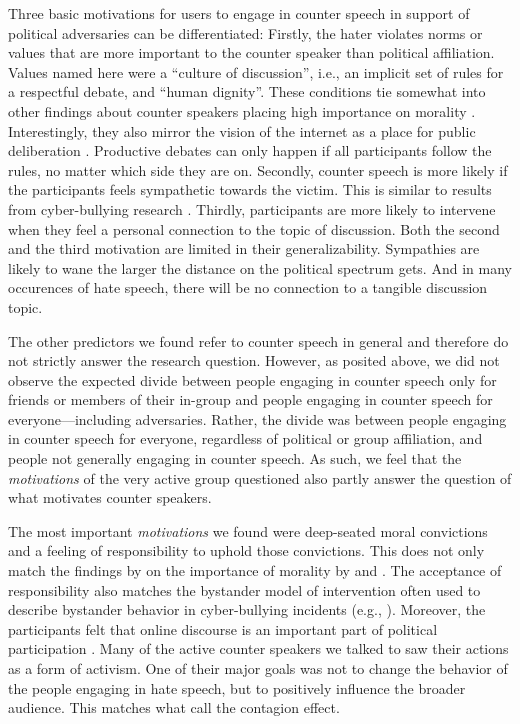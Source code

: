 \documentclass[runningheads]{llncs}
\begin{document}
Three basic motivations for users to engage in counter speech in support of political adversaries can be differentiated:
Firstly, the hater violates norms or values that are more important to the counter speaker than political affiliation.
Values named here were a \enquote{culture of discussion}, i.e., an implicit set of rules for a respectful debate, and \enquote{human dignity}.
These conditions tie somewhat into other findings about counter speakers placing high importance on morality \autocite{lambeStandingBullyingSocial2019,wilhelmGenderedMoralityBacklash2019}.
Interestingly, they also mirror the vision of the internet as a place for public deliberation \autocite{chenOnlineIncivilityPublic2017}.
Productive debates can only happen if all participants follow the rules, no matter which side they are on.
Secondly, counter speech is more likely if the participants feels sympathetic towards the victim.
This is similar to results from cyber-bullying research \autocite{lambeStandingBullyingSocial2019}. Thirdly, participants are more likely to intervene when they feel a personal connection to the topic of discussion. Both the second and the third motivation are limited in their generalizability. Sympathies are likely to wane the larger the distance on the political spectrum gets.
And in many occurences of hate speech, there will be no connection to a tangible discussion topic.

The other predictors we found refer to counter speech in general and therefore do not strictly answer the research question. However, as posited above, we did not observe the expected divide between people engaging in counter speech only for friends or members of their in-group and people engaging in counter speech for everyone---including adversaries. Rather, the divide was between people engaging in counter speech for everyone, regardless of political or group affiliation, and people not generally engaging in counter speech. As such, we feel that the \emph{motivations} of the very active group questioned also partly answer the question of what motivates counter speakers.

The most important \emph{motivations} we found were deep-seated moral convictions and a feeling of responsibility to uphold those convictions. This does not only match the findings by on the importance of morality by \textcite{wilhelmGenderedMoralityBacklash2019} and \textcite{lambeStandingBullyingSocial2019}. The acceptance of responsibility also matches the bystander model of intervention often used to describe bystander behavior in cyber-bullying incidents (e.g., \autocite{naabFlaggingUncivilUser2018}).
Moreover, the participants felt that online discourse is an important part of political participation \autocite{chenOnlineIncivilityPublic2017}.
Many of the active counter speakers we talked to saw their actions as a form of activism. One of their major goals was not to change the behavior of the people engaging in hate speech, but to positively influence the broader audience. This matches what \textcite{buergerCounterspeechLiteratureReview2019} call the contagion effect.
\end{document}
